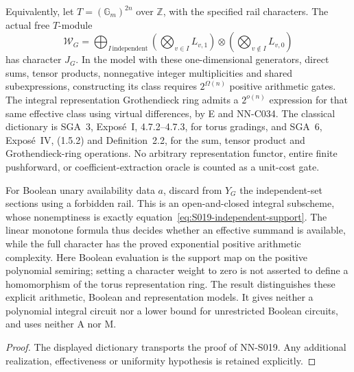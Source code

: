 \begin{geometricstatement}[NN-S019]
Equivalently, let $T=(\mathbb G_m)^{2n}$ over $\mathbb Z$,
with the specified rail characters.  The actual free
$T$-module
\[
 \mathcal W_G=
 \bigoplus_{I\,\text{independent}}
       \left(\bigotimes_{v\in I}L_{v,1}\right)
          \otimes
       \left(\bigotimes_{v\notin I}L_{v,0}\right)
\]
has character $J_G$.  In the model with these one-dimensional
generators, direct sums, tensor products, nonnegative integer
multiplicities and shared subexpressions, constructing its
class requires $2^{\Omega(n)}$ positive arithmetic gates.
The integral representation Grothendieck ring admits a
$2^{o(n)}$ expression for that same effective class using
virtual differences, by E and NN-C034.  The classical
dictionary is SGA~3, Expos\'e~I, 4.7.2--4.7.3, for torus
gradings, and SGA~6, Expos\'e~IV, (1.5.2) and Definition~2.2,
for the sum, tensor product and Grothendieck-ring operations.
No arbitrary representation functor, entire finite pushforward,
or coefficient-extraction oracle is counted as a unit-cost gate.

For Boolean unary availability data $a$, discard from $Y_G$
the independent-set sections using a forbidden rail.
This is an open-and-closed integral subscheme, whose nonemptiness
is exactly equation~\eqref{eq:S019-independent-support}.
The linear monotone formula thus decides whether an effective
summand is available, while the full character has the proved
exponential positive arithmetic complexity.  Here Boolean
evaluation is the support map on the positive polynomial
semiring; setting a character weight to zero is not asserted
to define a homomorphism of the torus representation ring.
The result distinguishes these explicit arithmetic, Boolean
and representation models.  It gives neither a polynomial
integral circuit nor a lower bound for unrestricted Boolean
circuits, and uses neither A nor M.
\end{geometricstatement}
\begin{proof} The displayed dictionary transports the proof of NN-S019. Any additional realization, effectiveness or uniformity hypothesis is retained explicitly.\end{proof}
